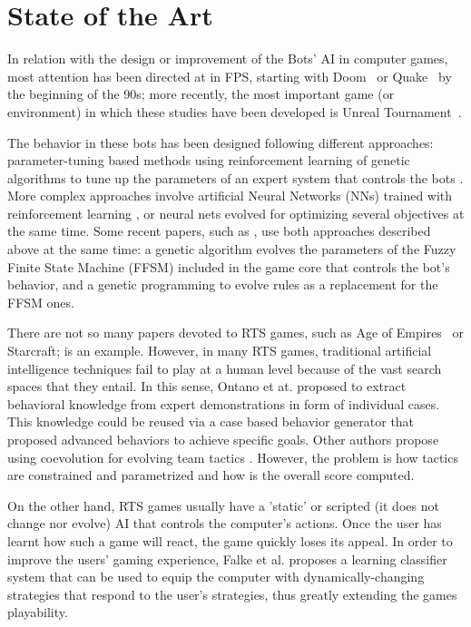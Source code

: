 \documentclass{llncs}
\begin{document}
%
\section{State of the Art}
\label{sec:stateofart}
%

In relation with the design or improvement of the Bots' AI in computer games,
most attention has been directed at in FPS, starting
with Doom\texttrademark~ or
Quake\texttrademark~\cite{laird2001using} by the beginning of the 90s;
more recently, the most important game (or environment) in which these
studies have been developed is Unreal
Tournament\texttrademark~\cite{Agent_Smith_CEC2009,ControllingBot_CEC2010,cooperativebots_CIG2010}.  

The behavior in these bots has been designed following different
approaches: parameter-tuning based methods using reinforcement learning
\cite{mcpargalCIG2008} of genetic algorithms to
tune up the parameters of an expert system that controls the
bots \cite{colomiCEC2004}. More complex approaches involve artificial
Neural Networks (NNs) trained with reinforcement learning
\cite{NN_FPS_IEICE2006}, or neural nets evolved for optimizing several
objectives at the same time\cite{schrummiikkuCIG09}. 
Some recent papers, such as \cite{ControllingBot_CEC2010}, use both approaches
described above at the same time: a genetic algorithm evolves the
parameters of the Fuzzy Finite State Machine (FFSM) included in the
game core that controls the bot's behavior, and a genetic programming
to evolve rules as a replacement for the FFSM ones.  

There are not so many papers devoted to RTS games, such as Age of
Empires\texttrademark~ or Starcraft\texttrademark;
\cite{hongchoCIG2005} is an example. However, in many RTS games,
traditional artificial intelligence techniques fail to play at a human
level because of the vast search spaces that they entail. In this
sense, Ontano et at. \cite{ontanon2007} proposed to extract
behavioral knowledge from expert demonstrations in form of individual
cases. This knowledge could be reused via a case based behavior
generator that proposed advanced behaviors to achieve specific
goals. Other authors propose using coevolution for evolving team tactics
\cite{avery2010coevolving}. However, the problem is how tactics are
constrained and parametrized and how is the overall score computed. 

On the other hand, RTS games usually have a 'static' or scripted (it
does not change nor evolve) AI that controls the computer's
actions. Once the user has learnt how such a game will react, the game
quickly loses its appeal. In order to improve the users' gaming
experience, Falke et al. \cite{falke2003} proposes a learning
classifier system that can be used to equip the computer with
dynamically-changing strategies that respond to the user's strategies,
thus greatly extending the games playability. 
\end{document}
